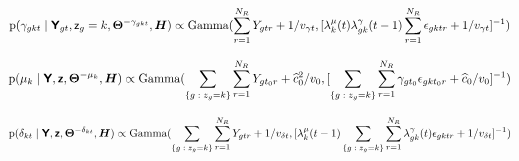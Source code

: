 \begin{equation}
\textrm{p}(\gamma_{gkt} \; | \; \mbox{\textsf{\textbf{Y}}}_{gt},\mbox{\textsf{z}}_g = k,\bm{\Theta}^{-\gamma_{gkt}},\bm{H}) \propto \textrm{Gamma}(\sum_{r=1}^{N_R} Y_{gtr} + 1/v_{\gamma t},[\lambda^{\mu}_{k}(t) \lambda^{\gamma}_{gk}(t-1) \sum_{r=1}^{N_R} \epsilon_{gktr} + 1/v_{\gamma t}]^{-1})
\end{equation}

\begin{equation}
\textrm{p}(\mu_{k} \; | \; \mbox{\textsf{\textbf{Y}}},\mbox{\textsf{\textbf{z}}},\bm{\Theta}^{-\mu_{k}},\bm{H}) \propto \textrm{Gamma}(\sum_{\{g \; : \; z_{g} = k \}} \sum_{r=1}^{N_R} Y_{gt_{0}r} + \widehat{c}^{2}_{0}/v_{0},[\sum_{\{g  \; : \; z_{g} = k \}} \sum_{r=1}^{N_R} \gamma_{gt_{0}} \epsilon_{gkt_{0}r} + \widehat{c}_{0}/v_{0}]^{-1})
\end{equation}

\begin{equation}
\textrm{p}(\delta_{kt} \; | \; \mbox{\textsf{\textbf{Y}}},\mbox{\textsf{\textbf{z}}},\bm{\Theta}^{-\delta_{kt}},\bm{H}) \propto \textrm{Gamma}(\sum_{\{g \; : \; z_{g} = k \}} \sum_{r=1}^{N_R} Y_{gtr} + 1/v_{\delta t},[\lambda^{\mu}_{k}(t-1) \sum_{\{g  \; : \; z_{g} = k \}} \sum_{r=1}^{N_R} \lambda^{\gamma}_{gk}(t) \epsilon_{gktr} + 1/v_{\delta t}]^{-1})
\end{equation}